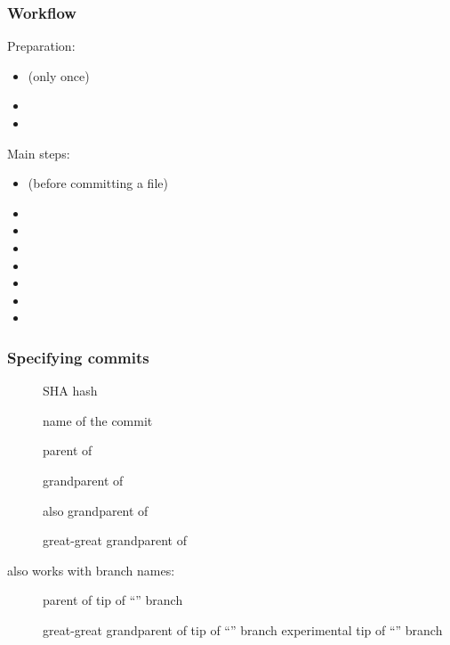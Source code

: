 \documentclass{git_course}
\begin{document}
\begin{frame}
\frametitle{Workﬂow}

Preparation:
\begin{itemize}
    \item {} (only once)
    \item {}
    \item {}
\end{itemize}

Main steps:
\begin{itemize}
    \item {} (before committing a file)
    \item {}
    \item {}
    \item {}
    \item {}
    \item {}
    \item {}
    \item {}
\end{itemize}
\end{frame}

\begin{frame}
\frametitle{Specifying commits}
\begin{description}
    \item[] SHA hash
    \item[] name of the commit
    \item[] parent of 
    \item[] grandparent of 
    \item[] also grandparent of 
    \item[] great-great grandparent of 
\end{description}

also works with branch names:
\begin{description}
    \item[] parent of tip of “” branch
    \item[] great-great grandparent of tip of “” branch
        experimental tip of “” branch
\end{description}
\end{frame}
\end{document}
